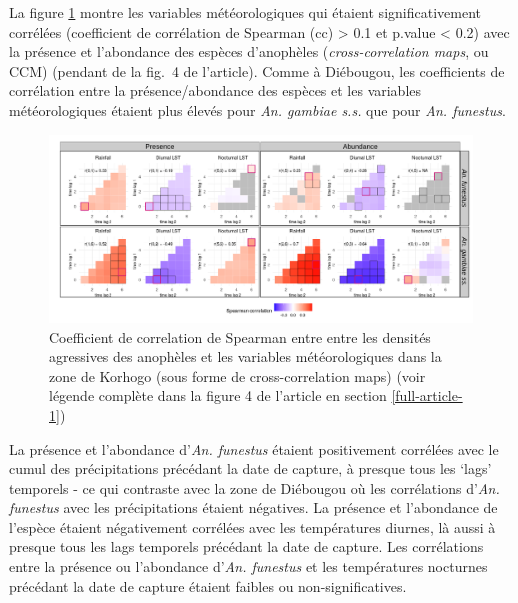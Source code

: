 \documentclass[12pt,twoside]{reedthesis}
\begin{document}
La figure \ref{fig:ccm-ci} montre les variables météorologiques qui étaient significativement corrélées (coefficient de corrélation de Spearman (cc) \textgreater{} 0.1 et p.value \textless{} 0.2) avec la présence et l'abondance des espèces d'anophèles (\emph{cross-correlation maps}, ou CCM) (pendant de la fig.~4 de l'article). Comme à Diébougou, les coefficients de corrélation entre la présence/abondance des espèces et les variables météorologiques étaient plus élevés pour \emph{An. gambiae s.s.} que pour \emph{An. funestus}.
\begin{figure}

{\centering \includegraphics[width=1.1\linewidth]{figure/ccm_ci} 

}

\caption[Coefficient de correlation de Spearman entre entre les densités agressives des anophèles et les variables météorologiques dans la zone de Korhogo (sous forme de cross-correlation maps)]{Coefficient de correlation de Spearman entre entre les densités agressives des anophèles et les variables météorologiques dans la zone de Korhogo (sous forme de cross-correlation maps) (voir légende complète dans la figure 4 de l'article en section \ref{full-article-1})}\label{fig:ccm-ci}
\end{figure}
La présence et l'abondance d'\emph{An. funestus} étaient positivement corrélées avec le cumul des précipitations précédant la date de capture, à presque tous les `lags' temporels - ce qui contraste avec la zone de Diébougou où les corrélations d'\emph{An. funestus} avec les précipitations étaient négatives. La présence et l'abondance de l'espèce étaient négativement corrélées avec les températures diurnes, là aussi à presque tous les lags temporels précédant la date de capture. Les corrélations entre la présence ou l'abondance d'\emph{An. funestus} et les températures nocturnes précédant la date de capture étaient faibles ou non-significatives.\\
\end{document}
